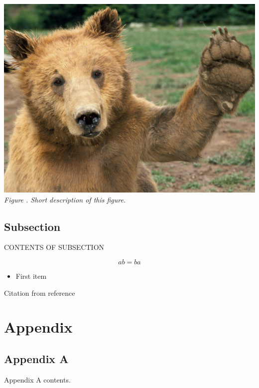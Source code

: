 \documentclass[11pt]{article}
\newcounter{cter}
\newcommand{\ccounter}{
	\thecter.
	\stepcounter{cter}
}
\begin{document}
	\begin{center}	%
		\includegraphics[scale=0.1]{example_pic}\\ %
		\textit{Figure\ccounter Short description of this figure.}
	\end{center}
		
	\subsection{Subsection}
	
	CONTENTS OF SUBSECTION
	
	\begin{equation}
		ab = ba	%
	\end{equation}
	
	\begin{itemize}
		\item First item %
	\end{itemize}
	
	Citation from reference \autocite{glad-06}
		
	\pagebreak
		
	\setcounter{secnumdepth}{0} %
	
	\printbibliography %
	
	\pagebreak
	
	\section{Appendix}
	\subsection{Appendix A} %
	
	Appendix A contents.
\end{document}
